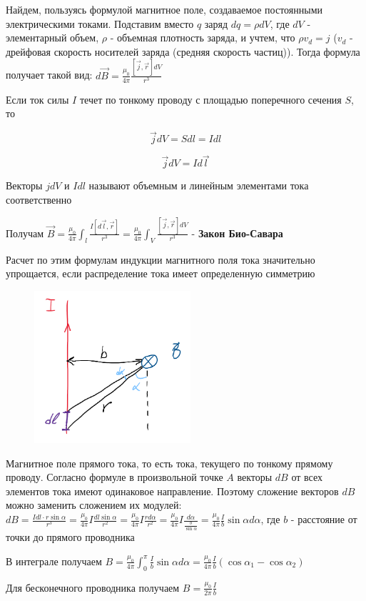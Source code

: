 Найдем, пользуясь формулой магнитное поле, создаваемое постоянными электрическими токами. Подставим вместо $q$ заряд $dq = \rho dV$, где $dV$ - элементарный объем,
$\rho$ - объемная плотность заряда, и учтем, что $\rho v_d = j$ ($v_d$ - дрейфовая скорость носителей заряда (средняя скорость частиц)). 
Тогда формула получает такой вид: $d\vec{B} = \frac{\mu_0}{4\pi} \frac{[\vec{j}, \vec{r}] dV}{r^3}$

Если ток силы $I$ течет по тонкому проводу с площадью поперечного сечения $S$, то 

\[\vec{j} dV = S dl = Idl\]

\[\vec{j} dV = Id\vec{l}\]

Векторы $jdV$ и $Idl$ называют объемным и линейным элементами тока соответственно

Получам $\vec{B} = \frac{\mu_0}{4\pi} \int_l \frac{I[d\vec{l}, \vec{r}]}{r^3} = \frac{\mu_0}{4\pi} \int_V \frac{[\vec{j}, \vec{r}] dV}{r^3}$ - \textbf{Закон Био-Савара}

Расчет по этим формулам индукции магнитного поля тока значительно упрощается, если распределение тока имеет определенную симметрию

\begin{minipage}{\textwidth}
    \begin{figure}
        \includegraphics[width=5.8cm]{physics2/images/physics2_2025_02_10_2}
    \end{figure}

    \Ex Магнитное поле прямого тока, то есть тока, текущего по тонкому прямому проводу. Согласно формуле в произвольной точке $A$
    векторы $dB$ от всех элементов тока имеют одинаковое направление. Поэтому сложение векторов $dB$ можно заменить сложением 
    их модулей: $dB = \frac{Idl \cdot r \sin \alpha}{r^3} = \frac{\mu_0}{4\pi} I \frac{dl \sin\alpha}{r^2} =
    \frac{\mu_0}{4\pi} I \frac{r d\alpha}{r^2} = \frac{\mu_0}{4\pi} I \frac{d\alpha}{\frac{b}{\sin\alpha}} = \frac{\mu_0}{4\pi} \frac{I}{b} \sin \alpha d\alpha$, где $b$ - расстояние от точки до прямого проводника

    В интеграле получаем $B = \frac{\mu_0}{4\pi} \int_{0}^{\pi} \frac{I}{b} \sin \alpha d\alpha = \frac{\mu_0}{4\pi} \frac{I}{b} (\cos \alpha_1 - \cos \alpha_2)$

    Для бесконечного проводника получаем $B = \frac{\mu_0}{2\pi} \frac{I}{b}$
\end{minipage}

